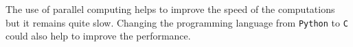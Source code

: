 \documentclass[11 pt]{article}
\begin{document}
The use of parallel computing helps to improve the speed of the computations but it remains quite slow. Changing the programming language from \texttt{Python} to \texttt{C} could also help to improve the performance.

\nocite{*}
\printbibheading
\printbibliography[type=book,heading=subbibliography,title={Book Sources}]
\printbibliography[nottype=book, nottype=online, heading=subbibliography,title={Article Sources}]
\printbibliography[type=online,heading=subbibliography,title={Online Sources}]
\end{document}
